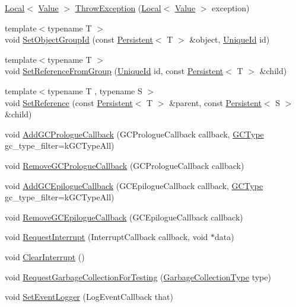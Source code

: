 \begin{DoxyCompactItemize}
\item 
\hyperlink{classv8_1_1_local}{Local}$<$ \hyperlink{classv8_1_1_value}{Value} $>$ \hyperlink{classv8_1_1_isolate_aba648b3c00dc9f1ef2a22195d99e22e8}{Throw\+Exception} (\hyperlink{classv8_1_1_local}{Local}$<$ \hyperlink{classv8_1_1_value}{Value} $>$ exception)
\item 
{\footnotesize template$<$typename T $>$ }\\void \hyperlink{classv8_1_1_isolate_ae4418cb238686a321aa406e90c72fab5}{Set\+Object\+Group\+Id} (const \hyperlink{classv8_1_1_persistent}{Persistent}$<$ T $>$ \&object, \hyperlink{classv8_1_1_unique_id}{Unique\+Id} id)
\item 
{\footnotesize template$<$typename T $>$ }\\void \hyperlink{classv8_1_1_isolate_a0f8484db111e967d70ea7551b3593ce6}{Set\+Reference\+From\+Group} (\hyperlink{classv8_1_1_unique_id}{Unique\+Id} id, const \hyperlink{classv8_1_1_persistent}{Persistent}$<$ T $>$ \&child)
\item 
{\footnotesize template$<$typename T , typename S $>$ }\\void \hyperlink{classv8_1_1_isolate_a055fc73d18747b96c51f00599cdd3ec1}{Set\+Reference} (const \hyperlink{classv8_1_1_persistent}{Persistent}$<$ T $>$ \&parent, const \hyperlink{classv8_1_1_persistent}{Persistent}$<$ S $>$ \&child)
\item 
void \hyperlink{classv8_1_1_isolate_ac5614f2eae055c949927bc8daddf90c3}{Add\+G\+C\+Prologue\+Callback} (G\+C\+Prologue\+Callback callback, \hyperlink{namespacev8_ac109d6f27e0c0f9ef4e98bcf7a806cf2}{G\+C\+Type} gc\+\_\+type\+\_\+filter=k\+G\+C\+Type\+All)
\item 
void \hyperlink{classv8_1_1_isolate_a7902b8b58f3c85bac9b7dd1086fa81ce}{Remove\+G\+C\+Prologue\+Callback} (G\+C\+Prologue\+Callback callback)
\item 
void \hyperlink{classv8_1_1_isolate_add9cac1ffd6cb1b7ed6b0956cebae129}{Add\+G\+C\+Epilogue\+Callback} (G\+C\+Epilogue\+Callback callback, \hyperlink{namespacev8_ac109d6f27e0c0f9ef4e98bcf7a806cf2}{G\+C\+Type} gc\+\_\+type\+\_\+filter=k\+G\+C\+Type\+All)
\item 
void \hyperlink{classv8_1_1_isolate_a277144482f5fefd58d822c22a173b01a}{Remove\+G\+C\+Epilogue\+Callback} (G\+C\+Epilogue\+Callback callback)
\item 
void \hyperlink{classv8_1_1_isolate_a971b6094ecc6c7f55eb6f58a71a8afd3}{Request\+Interrupt} (Interrupt\+Callback callback, void $\ast$data)
\item 
void \hyperlink{classv8_1_1_isolate_a00790d743cec68bbaa8ca7dbf6257f05}{Clear\+Interrupt} ()
\item 
void \hyperlink{classv8_1_1_isolate_a59fe893ed7e9df52cef2d59b2d98ab23}{Request\+Garbage\+Collection\+For\+Testing} (\hyperlink{classv8_1_1_isolate_a5ae00cc99d8aca148c6f5f9698c432c9}{Garbage\+Collection\+Type} type)
\item 
void \hyperlink{classv8_1_1_isolate_a28bf18f2f6ed468ec97f59df682e73c1}{Set\+Event\+Logger} (Log\+Event\+Callback that)
\end{DoxyCompactItemize}
